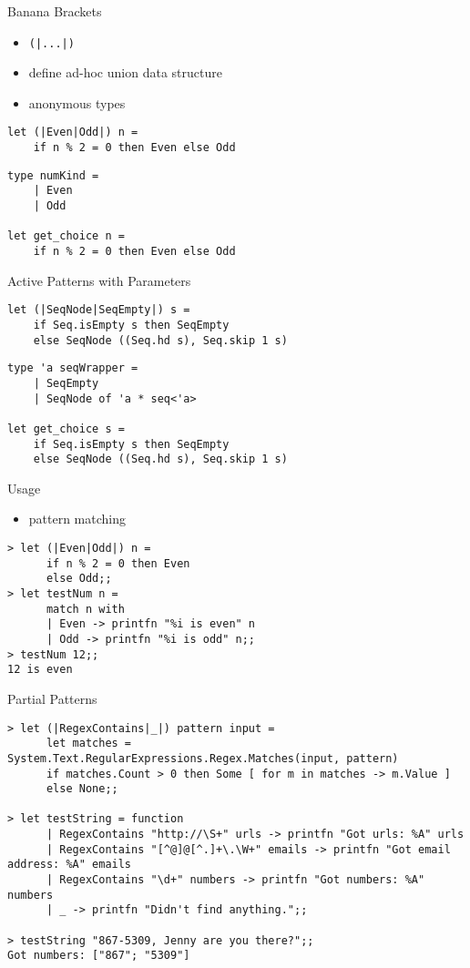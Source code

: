 \documentclass{beamer}
\begin{document}
\begin{frame}[fragile]{Banana Brackets}
  \begin{itemize}[<+->]
    \item \texttt{(|...|)}
    \item define ad-hoc union data structure
    \item anonymous types
  \end{itemize}
  \pause
  \begin{verbatim}
let (|Even|Odd|) n =
    if n % 2 = 0 then Even else Odd
  \end{verbatim}
  \pause
  \begin{verbatim}
type numKind =
    | Even
    | Odd

let get_choice n =
    if n % 2 = 0 then Even else Odd
  \end{verbatim}
\end{frame}

\begin{frame}[fragile]{Active Patterns with Parameters}
  \begin{verbatim}
let (|SeqNode|SeqEmpty|) s =
    if Seq.isEmpty s then SeqEmpty
    else SeqNode ((Seq.hd s), Seq.skip 1 s)
  \end{verbatim}
  \pause
  \begin{verbatim}
type 'a seqWrapper =
    | SeqEmpty
    | SeqNode of 'a * seq<'a>

let get_choice s =
    if Seq.isEmpty s then SeqEmpty
    else SeqNode ((Seq.hd s), Seq.skip 1 s)
  \end{verbatim}
\end{frame}

\begin{frame}[fragile]{Usage}
  \begin{itemize}
    \item pattern matching
  \end{itemize}
  \begin{verbatim}
> let (|Even|Odd|) n =
      if n % 2 = 0 then Even
      else Odd;;
> let testNum n =
      match n with
      | Even -> printfn "%i is even" n
      | Odd -> printfn "%i is odd" n;;
> testNum 12;;
12 is even
  \end{verbatim}
\end{frame}

\begin{frame}[fragile]{Partial Patterns}
  \tiny
  \begin{verbatim}
> let (|RegexContains|_|) pattern input =
      let matches = System.Text.RegularExpressions.Regex.Matches(input, pattern)
      if matches.Count > 0 then Some [ for m in matches -> m.Value ]
      else None;;

> let testString = function
      | RegexContains "http://\S+" urls -> printfn "Got urls: %A" urls
      | RegexContains "[^@]@[^.]+\.\W+" emails -> printfn "Got email address: %A" emails
      | RegexContains "\d+" numbers -> printfn "Got numbers: %A" numbers
      | _ -> printfn "Didn't find anything.";;

> testString "867-5309, Jenny are you there?";;
Got numbers: ["867"; "5309"]
  \end{verbatim}
\end{frame}
\end{document}
